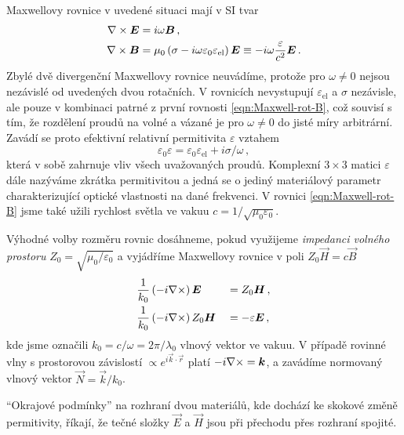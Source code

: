 Maxwellovy rovnice v uvedené situaci mají v SI tvar
\begin{align}
    \nabla\times \bm{E}&=i\omega\bm{B} \,, \label{eqn:Maxwell-rot-E} \\
    \nabla\times \bm{B}&=\mu_0 \left( \sigma - i\omega \varepsilon_0 \varepsilon_{\textrm{el}} \right) \bm{E} 
        \equiv -i\omega\frac{\varepsilon}{c^2} \bm{E} \,. \label{eqn:Maxwell-rot-B}
\end{align}
Zbylé dvě divergenční Maxwellovy rovnice neuvádíme, protože pro $\omega\neq 0$ nejsou nezávislé od uvedených dvou rotačních.
V rovnicích nevystupují $\varepsilon_{\textrm{el}}$ a $\sigma$ nezávisle, ale pouze v kombinaci patrné z první rovnosti \eqref{eqn:Maxwell-rot-B}, což souvisí s tím, že rozdělení proudů na volné a vázané je pro $\omega\neq 0$ do jisté míry arbitrární.
Zavádí se proto efektivní relativní permitivita $\varepsilon$ vztahem
\begin{equation}
    \varepsilon_0 \varepsilon=\varepsilon_0 \varepsilon_{\textrm{el}}+i\sigma/\omega \,,
\end{equation}
která v sobě zahrnuje vliv všech uvažovaných proudů.
Komplexní $3\times 3$ matici $\varepsilon$ dále nazýváme zkrátka permitivitou a jedná se o jediný materiálový parametr charakterizující optické vlastnosti na dané frekvenci.
V rovnici \eqref{eqn:Maxwell-rot-B} jsme také užili rychlost světla ve vakuu $c=1/\sqrt{\mu_0 \varepsilon_0}$.

Výhodné volby rozměru rovnic dosáhneme, pokud využijeme \emph{impedanci volného prostoru} $Z_0 = \sqrt{\mu_0/\varepsilon_0}$ a vyjádříme Maxwellovy rovnice v poli $Z_0 \vec{H}=c \vec{B}$
\begin{alignat}{2}
    & \frac{1}{k_0} \left( -i \nabla\times \right) \bm{E} &&= Z_0 \bm{H} \,, \label{eqn:rot-E}\\
    & \frac{1}{k_0} \left( -i \nabla\times \right) Z_0 \bm{H} &&=-\varepsilon \bm{E} \,, \label{eqn:rot-ZH}
\end{alignat}
kde jsme označili $k_0 = c/\omega = 2\pi/\lambda_0$ vlnový vektor ve vakuu.
V případě rovinné vlny s prostorovou závislostí $\propto e^{i \vec{k}\cdot \vec{r}}$ platí $-i \nabla\times = \bm{k}$, a zavádíme normovaný vlnový vektor $\vec{N}=\vec{k}/k_0$.

``Okrajové podmínky'' na rozhraní dvou materiálů, kde dochází ke skokové změně permitivity, říkají, že tečné složky $\vec{E}$ a $\vec{H}$ jsou při přechodu přes rozhraní spojité.
